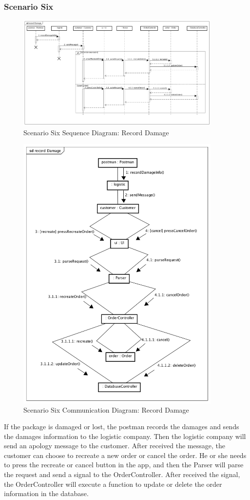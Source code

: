\documentclass[12pt]{scrreprt}
\begin{document}
\subsubsection{Scenario Six}
\begin{figure}[H]
  \centering\includegraphics[width=4in]{DocumentRes/6SequenceDiagram_recordDamage.png}
  \caption{Scenario Six Sequence Diagram: Record Damage}
\end{figure}
\begin{figure}[H]
  \centering\includegraphics[width=4in]{DocumentRes/6CommunicationDiagram_recordDamage.png}
  \caption{Scenario Six Communication Diagram: Record Damage}
\end{figure}
If the package is damaged or lost, the postman records the damages and sends
the damages information to the logistic company. Then the logistic company will
send an apology  message to the customer. After received the message, the
customer can choose to recreate a new order or cancel the order. He or she
needs to press the recreate or cancel button in the app, and then the Parser
will parse the request and send a signal to the OrderController. After received
the signal, the OrderController will execute a function to update or delete the
order information in the database.
\end{document}
